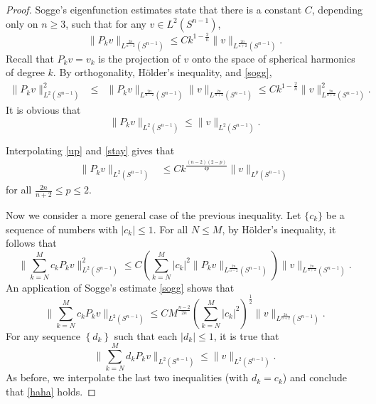 \documentclass[11pt]{amsart}
\theoremstyle{plain}
\numberwithin{equation}{section}
\begin{document}
\begin{proof}
Sogge's \cite{Sog86} eigenfunction estimates state that there is a constant $C$, depending only on $n \ge 3$, such that for any $v\in L^2(S^{n-1})$,
\begin{equation}
\| P_k v\|_{L^{\frac{2n}{n-2}}(S^{n-1})}
\leq Ck^{1-\frac{2}{n}} \|v\|_{L^{\frac{2n}{n+2}}(S^{n-1})}.
\label{sogg}
\end{equation}
Recall that $P_k v = v_k$ is the projection of $v$ onto the space of spherical harmonics of degree $k$.
By orthogonality, H\"older's inequality, and \eqref{sogg},
\begin{eqnarray}
\| P_k v\|^2_{L^{2}(S^{n-1})}
&\leq & \| P_k v\|_{L^{\frac{2n}{n-2}}(S^{n-1})} \|  v\|_{L^{\frac{2n}{n+2}}(S^{n-1})} 
\leq  Ck^{1-\frac{2}{n}}\|  v\|^2_{L^{\frac{2n}{n+2}}(S^{n-1})}.
\label{up}
\end{eqnarray}
It is obvious that
\begin{equation}
 \| P_k v\|_{L^{2}(S^{n-1})} \leq \|v\|_{L^{2}(S^{n-1})}.
 \label{stay}
\end{equation}

Interpolating \eqref{up} and \eqref{stay} gives that
\begin{align}
\| P_k v\|_{L^{2}(S^{n-1})} &\leq C k^{\frac{(n-2)(2-p)}{4p}}
\|v\|_{L^{p}(S^{n-1})} \label{indu}
\end{align}
for all $\frac{2n}{n+2}\leq p\leq 2$.

Now we consider a more general case of the previous inequality.
Let $\{c_k\}$ be a sequence of numbers with $|c_k|\leq 1$.
For all $N\leq M$, by H\"older's inequality, it follows that
\begin{equation*}
\|\sum^{M}_{k=N} c_k P_k v\|^2_{L^2(S^{n-1})}
\leq C{\left( {\sum^M_{k=N} |c_k|^2 \|P_k v\|_{L^{\frac{2n}{n-2}}(S^{n-1})}} \right) }\|v\|_{L^{\frac{2n}{n+2}}(S^{n-1})}.
\end{equation*}
An application of Sogge's estimate \eqref{sogg} shows that
\begin{equation*}
\|\sum^M_{k=N} c_k P_k v\|_{L^2(S^{n-1})}
\leq C M^\frac{n-2}{2n} {\left( {\sum^M_{k=N} |c_k|^2} \right) }^{\frac{1}{2}} \|v\|_{L^{\frac{2n}{n+2}}(S^{n-1})}.
\end{equation*}
For any sequence ${\left\{{d_k}\right\}}$ such that each $|d_k|\leq 1$, it is true that
\begin{equation}
\|\sum^M_{k=N} d_k P_k v\|_{L^2(S^{n-1})}
\leq \| v\|_{L^2(S^{n-1})}.
\label{seqSame}
\end{equation}
As before, we interpolate the last two inequalities (with $d_k = c_k$) and conclude that \eqref{haha} holds.

\end{proof}
\end{document}
